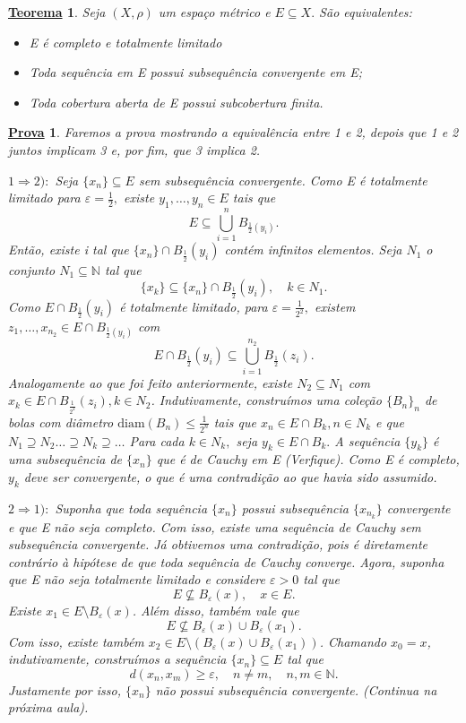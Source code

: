 \documentclass{article}
\newtheorem*{theorem*}{\underline{Teorema}}
\newtheorem*{proof*}{\underline{Prova}}
\begin{document}
\begin{theorem*}
  Seja \((X, \rho )\) um espaço métrico e \(E\subseteq{X}.\) São equivalentes:
 \begin{itemize}
  \item[1)]E é completo e totalmente limitado
  \item[2)] Toda sequência em E possui subsequência convergente em E;
  \item[3)] Toda cobertura aberta de E possui subcobertura finita.
 \end{itemize}
\end{theorem*}
\begin{proof*}
  Faremos a prova mostrando a equivalência entre 1 e 2, depois que 1 e 2 juntos implicam 3 e, por fim, que 3 implica 2.

  \(1 \Rightarrow 2):\) Seja \(\{x_{n}\}\subseteq{E}\) sem subsequência convergente. Como E é totalmente limitado para \(\varepsilon = \frac{1}{2},\) existe
 \(y_{1}, \dotsc, y_{n}\in E\) tais que 
  \[
    E\subseteq{\bigcup_{i=1}^{n}{B_{\frac{1}{2}(y_{i})}}}.
  \]
  Então, existe i tal que \(\{x_{n}\}\cap B_{\frac{1}{2}}(y_{i})\) contém infinitos elementos. Seja \(N_{1}\) o conjunto \(N_{1}\subseteq{\mathbb{N}}\) tal que 
  \[
    \{x_{k}\}\subseteq{\{x_{n}\}\cap B_{\frac{1}{2}}(y_{i}),}\quad k\in N_{1}.
  \]
  Como \(E\cap B_{\frac{1}{2}}(y_{i})\) é totalmente limitado, para \(\varepsilon = \frac{1}{2^{2}},\) existem \(z_{1}, \dotsc, x_{n_{2}}\in E\cap B_{\frac{1}{2}(y_{i})}\)
com 
  \[
    E\cap B_{\frac{1}{2}}(y_{i})\subseteq{\bigcup_{i=1}^{n_{2}}{B_{\frac{1}{2}}(z_{i})}}.
  \]
  Analogamente ao que foi feito anteriormente, existe \(N_{2}\subseteq{N_{1}}\) com \(x_{k}\in E\cap B_{\frac{1}{2^{2}}}(z_{i}), k \in N_{2}\). Indutivamente, construímos uma coleção
\(\{B_{n}\}_{n}\) de bolas com diâmetro \(\mathrm{diam}(B_{n})\leq \frac{1}{2^{n}}\) tais que \(x_{n}\in E\cap B_{k}, n\in N_{k}\) e que \(N_{1}\supseteq{N_{2}}\dotsc \supseteq{N_{k}}\supseteq{\dotsc}\)
Para cada \(k\in N_{k},\) seja \(y_{k}\in E\cap B_{k}.\) A sequência \(\{y_{k}\}\) é uma subsequência de \(\{x_{n}\}\) que é de Cauchy em E (Verfique). Como E é completo, 
 \(y_{k}\) deve ser convergente, o que é uma contradição ao que havia sido assumido.

  \(2 \Rightarrow 1):\) Suponha que toda sequência \(\{x_{n}\}\) possui subsequência \(\{x_{n_{k}}\}\) convergente e que E não seja completo. Com isso, existe uma
sequência de Cauchy sem subsequência convergente. Já obtivemos uma contradição, pois é diretamente contrário à hipótese de que toda sequência de Cauchy converge. Agora, suponha que E
não seja totalmente limitado e considere \(\varepsilon >0\) tal que 
  \[
    E\not\subseteq{B_{\varepsilon }(x)}, \quad x\in E.
  \]
  Existe \(x_{1}\in E\setminus{B_{\varepsilon }(x)}\). Além disso, também vale que 
  \[
    E\not\subseteq{B_{\varepsilon }(x)\cup B_{\varepsilon }(x_{1})}.
  \]
  Com isso, existe também \(x_{2}\in E\setminus{(B_{\varepsilon }(x)\cup B_{\varepsilon }(x_{1}))}\). Chamando 
 \(x_{0} = x\), indutivamente, construímos a sequência \(\{x_{n}\}\subseteq{E}\) tal que 
  \[
    d(x_{n}, x_{m})\geq \varepsilon, \quad n\neq m,\quad n, m\in \mathbb{N}.
  \]
  Justamente por isso, \(\{x_{n}\}\) não possui subsequência convergente. (Continua na próxima aula).
\end{proof*}
\end{document}
